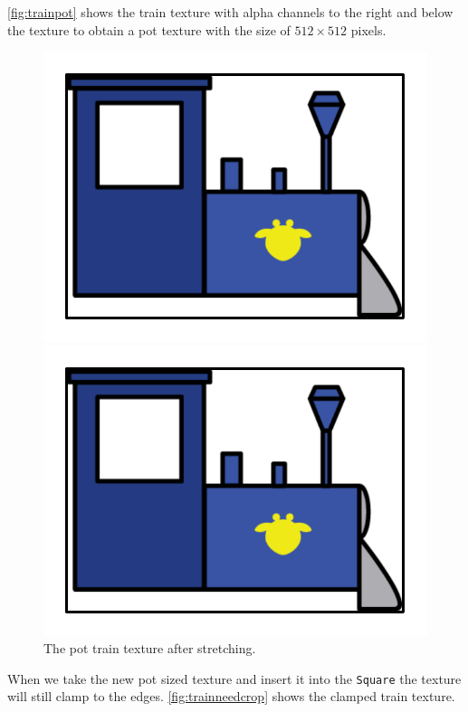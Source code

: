 \autoref{fig:trainpot} shows the train texture with alpha channels to the right and below the texture to obtain a \ac{pot} texture with the size of $512 \times 512$ pixels.
\begin{figure}[H]
\begin{minipage}[b]{0.5\columnwidth}
\centering
\includegraphics[page=3,width=0.8\columnwidth]{img/powerOfTwo.pdf}
\caption{The \ac{pot} train texture inside the \lstinline|Square| container.\label{fig:trainneedcrop}}
\end{minipage}
\hspace{0.5cm}
\begin{minipage}[b]{0.5\columnwidth}
\centering
\includegraphics[page=4,width=0.8\columnwidth]{img/powerOfTwo.pdf}
\caption{The \ac{pot} train texture after stretching.\label{fig:trainresult}}
\end{minipage}
\end{figure}
When we take the new \ac{pot} sized texture and insert it into the \lstinline|Square| the texture will still clamp to the edges. \autoref{fig:trainneedcrop} shows the clamped train texture.

